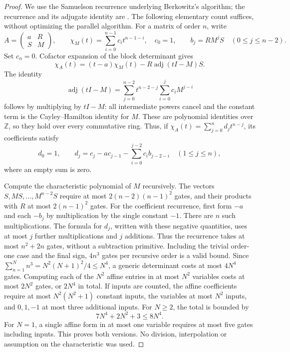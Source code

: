 \begin{proof}
We use the Samuelson recurrence underlying Berkowitz's algorithm;
the recurrence and its adjugate identity are
\cite[Claims~1--2, p.~148]{Berkowitz1984}.
The following elementary count suffices, without optimizing the
parallel algorithm.  For a matrix of order $n$, write
\[
 A=\begin{pmatrix}a&R\\ S&M\end{pmatrix},\qquad
 \chi_M(t)=\sum_{i=0}^{n-1}c_i t^{n-1-i},\quad c_0=1,
 \qquad b_j=RM^jS\quad(0\leq j\leq n-2).
\]
Set $c_n=0$.  Cofactor expansion of the block determinant gives
\[
 \chi_A(t)=(t-a)\chi_M(t)-R\operatorname{adj}(tI-M)S.
\]
The identity
\[
 \operatorname{adj}(tI-M)
 =\sum_{j=0}^{n-2}t^{n-2-j}
       \sum_{i=0}^{j}c_i M^{j-i}
\]
follows by multiplying by $tI-M$: all intermediate powers cancel and
the constant term is the Cayley--Hamilton identity for $M$.
These are polynomial identities over $\mathbb Z$, so they hold over
every commutative ring.  Thus, if
$\chi_A(t)=\sum_{j=0}^n d_jt^{n-j}$, its coefficients satisfy
\[
 d_0=1,\qquad
 d_j=c_j-ac_{j-1}-\sum_{i=0}^{j-2}c_i b_{j-2-i}
       \quad(1\leq j\leq n),
\]
where an empty sum is zero.

Compute the characteristic polynomial of $M$ recursively.  The
vectors $S,MS,\ldots,M^{n-2}S$ require at most
$2(n-2)(n-1)^2$ gates, and their products with $R$ at most
$2(n-1)^2$ gates.  For the coefficient recurrence, first form
$-a$ and each $-b_j$ by multiplication by the single constant $-1$.
There are $n$ such multiplications.  The formula for $d_j$, written
with these negative quantities, uses at most $j$ further
multiplications and $j$ additions.  Thus the recurrence takes
at most $n^2+2n$ gates, without a subtraction primitive.
Including the trivial order-one case and
the final sign, $4n^3$ gates per recursive order is a valid bound.
Since $\sum_{n=1}^N n^3=N^2(N+1)^2/4\leq N^4$, a generic
determinant costs at most $4N^4$ gates.  Computing each of the $N^2$
affine entries in at most $N^2$ variables costs at most $2N^2$
gates, or $2N^4$ in total.  If inputs are counted, the affine
coefficients require at most $N^2(N^2+1)$ constant inputs, the
variables at most $N^2$ inputs, and $0,1,-1$ at most three
additional inputs.  For $N\geq2$, the total is bounded by
\[
 7N^4+2N^2+3\leq8N^4.
\]
For $N=1$, a single affine form in at most one variable requires
at most five gates including inputs.  This proves both versions.
No division, interpolation or assumption on the characteristic was
used.
\end{proof}

